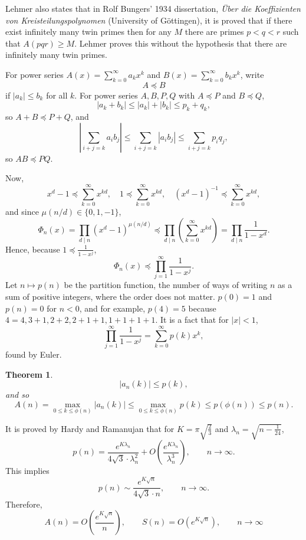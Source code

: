 \documentclass{article}
\newtheorem{theorem}{Theorem}
\theoremstyle{definition}
\begin{document}
Lehmer also states that in Rolf Bungers' 1934 dissertation, {\em \"Uber die Koeffizienten von Kreisteilungspolynomen} (University of G\"ottingen), 
it is proved that if there exist infinitely many twin primes then 
for any $M$ there are primes $p<q<r$ such that $A(pqr) \geq M$. Lehmer proves this without
the hypothesis that there are infinitely many twin primes.



For power series $A(x) = \sum_{k=0}^\infty a_k x^k$ and $B(x)=\sum_{k=0}^\infty b_k x^k$, write
\[
A \preceq B
\]
if $|a_k| \leq b_k$ for all $k$.
For power series $A,B,P,Q$ with $A \preceq P$ and $B \preceq Q$,
\[
|a_k+b_k| \leq |a_k|+|b_k| \leq p_k+q_k,
\]
so $A+B \preceq P+Q$, and
\[
\left| \sum_{i+j=k} a_i b_j \right| \leq \sum_{i+j=k} |a_i b_j|
\leq \sum_{i+j=k} p_i q_j,
\]
so $AB \preceq PQ$. 

Now,  
\[
x^d-1 \preceq \sum_{k=0}^\infty x^{kd},
\quad 1 \preceq \sum_{k=0}^\infty x^{kd},
\quad (x^d-1)^{-1} \preceq \sum_{k=0}^\infty x^{kd},
\]
 and since $\mu(n/d) \in \{0,1,-1\}$,
\begin{equation}
\Phi_n(x) = \prod_{d \mid n} (x^d-1)^{\mu(n/d)}
\preceq
\prod_{d \mid n} \left( \sum_{k=0}^\infty x^{kd} \right)
=\prod_{d \mid n} \frac{1}{1-x^d}.
\label{dproduct}
\end{equation}
Hence, because $1 \preceq \frac{1}{1-x^j}$,
\[
\Phi_n(x)  
\preceq \prod_{j=1}^\infty \frac{1}{1-x^j}.
\]
Let $n \mapsto p(n)$ be the partition function, the number of ways of writing
$n$ as a sum of positive integers, where the order does not matter. $p(0)=1$ and $p(n)=0$ for $n<0$, and
for example, $p(4)=5$ because $4=4,3+1,2+2,2+1+1,1+1+1+1$. It is a  fact that for $|x|<1$,
\[
 \prod_{j=1}^\infty \frac{1}{1-x^j} = \sum_{k=0}^\infty p(k) x^k,
\]
found by Euler.

\begin{theorem}
\[
|a_n(k)| \leq p(k),
\]
and so 
\[
A(n) = \max_{0 \leq k \leq \phi(n)} |a_n(k)| \leq
\max_{0 \leq k \leq \phi(n)} p(k)
\leq p(\phi(n)) \leq p(n).
\]
\label{partition}
\end{theorem}

It is proved by Hardy and Ramanujan \cite[p.~166, Chapter VII]{chandra} that
for $K=\pi \sqrt{\frac{2}{3}}$ and $\lambda_n = \sqrt{n-\frac{1}{24}}$, 
\[
p(n) = \frac{e^{K\lambda_n}}{4\sqrt{3}\cdot \lambda_n^2} + O\left( \frac{e^{K\lambda_n}}{\lambda_n^3}\right),
\qquad n \to \infty.
\]
This implies 
\[
p(n) \sim \frac{e^{K \sqrt{n}}}{4\sqrt{3} \cdot n}, \qquad n \to \infty.
\]
Therefore,
\[
A(n) = O\left(\frac{e^{K\sqrt{n}}}{n}\right),\qquad
S(n) = O(e^{K\sqrt{n}}),
\qquad n \to \infty
\]
\end{document}
